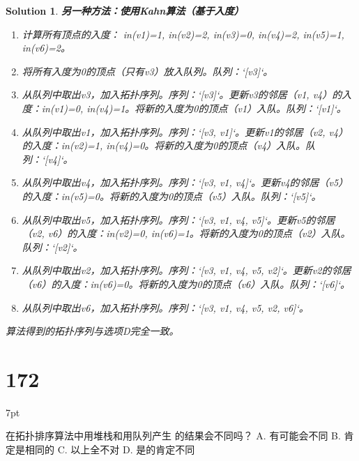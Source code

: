 \documentclass[UTF8]{report}
\newtheorem{solution}{Solution}
\theoremstyle{MyLineTheoremStyle} %
\theoremstyle{MyBlockTheoremStyle} %
\theoremstyle{MySubsubsectionStyle} %
\newenvironment{graybox}{%
        \def\FrameCommand{%
        \hspace{1pt}%
        {\color{gray}\small \vrule width 2pt}%
        {\color{graybox_color}\vrule width 4pt}%
        \colorbox{graybox_color}%
        }%
        \MakeFramed{\advance\hsize-\width\FrameRestore}%
        \noindent\hspace{-4.55pt}%
        \begin{adjustwidth}{}{7pt}%
        \vspace{2pt}\vspace{2pt}%
        }
        {%
        \vspace{2pt}\end{adjustwidth}\endMakeFramed%
        }
\begin{document}
\begin{solution}
\textbf{另一种方法：使用Kahn算法（基于入度）}
\begin{enumerate}
    \item 计算所有顶点的入度：
    in(v1)=1, in(v2)=2, in(v3)=0, in(v4)=2, in(v5)=1, in(v6)=2。
    \item 将所有入度为0的顶点（只有v3）放入队列。队列：`[v3]`。
    \item 从队列中取出v3，加入拓扑序列。序列：`[v3]`。更新v3的邻居（v1, v4）的入度：in(v1)=0, in(v4)=1。将新的入度为0的顶点（v1）入队。队列：`[v1]`。
    \item 从队列中取出v1，加入拓扑序列。序列：`[v3, v1]`。更新v1的邻居（v2, v4）的入度：in(v2)=1, in(v4)=0。将新的入度为0的顶点（v4）入队。队列：`[v4]`。
    \item 从队列中取出v4，加入拓扑序列。序列：`[v3, v1, v4]`。更新v4的邻居（v5）的入度：in(v5)=0。将新的入度为0的顶点（v5）入队。队列：`[v5]`。
    \item 从队列中取出v5，加入拓扑序列。序列：`[v3, v1, v4, v5]`。更新v5的邻居（v2, v6）的入度：in(v2)=0, in(v6)=1。将新的入度为0的顶点（v2）入队。队列：`[v2]`。
    \item 从队列中取出v2，加入拓扑序列。序列：`[v3, v1, v4, v5, v2]`。更新v2的邻居（v6）的入度：in(v6)=0。将新的入度为0的顶点（v6）入队。队列：`[v6]`。
    \item 从队列中取出v6，加入拓扑序列。序列：`[v3, v1, v4, v5, v2, v6]`。
\end{enumerate}
算法得到的拓扑序列与选项D完全一致。
\end{solution}


\section*{172}
\begin{graybox}
在拓扑排序算法中用堆栈和用队列产生
的结果会不同吗？
A. 有可能会不同
B. 肯定是相同的
C. 以上全不对
D. 是的肯定不同
\end{graybox}
\end{document}
